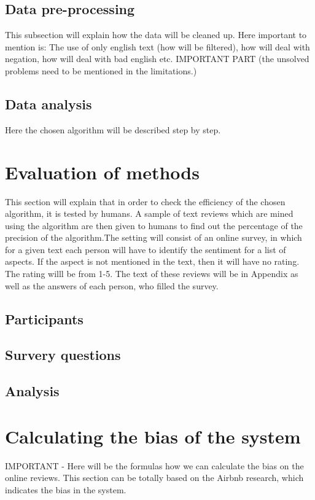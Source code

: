 \subsection{Data pre-processing}
This subsection will explain how the data will be cleaned up. Here important to mention is: The use of only english text (how will be filtered), how will deal with negation, how will deal with bad english etc. IMPORTANT PART (the unsolved problems need to be mentioned in the limitations.)
\subsection{Data analysis}
Here the chosen algorithm will be described step by step. 

\section{Evaluation of methods}
This section will explain that in order to check the efficiency of the chosen algorithm, it is tested by humans. A sample of text reviews which are mined using the algorithm are then given to humans to find out the percentage of the precision of the algorithm.The setting will consist of an online survey, in which for a given text each person will have to identify the sentiment for a list of aspects. If the aspect is not mentioned in the text, then it will have no rating. The rating willl be from 1-5. The text of these reviews will be in Appendix as well as the answers of each person, who filled the survey.
\subsection{Participants}
\subsection{Survery questions}
\subsection{Analysis}
\section{Calculating the bias of the system}
IMPORTANT - Here will be the formulas how we can calculate the bias on the online reviews. This section can be totally based on the Airbnb research, which indicates the bias in the system.